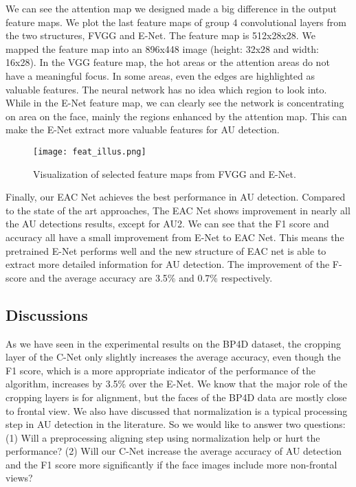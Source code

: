 \documentclass[a4paper, 10pt, conference]{ieeeconf}      %
\begin{document}
We can see the attention map we designed made a big difference in the output feature maps. We plot the last feature maps of group 4 convolutional layers from the two structures, FVGG and E-Net. The feature map is 512x28x28. We mapped the feature map into an 896x448 image (height: 32x28 and width: 16x28). In the VGG feature map, the hot areas or the attention areas do not have a meaningful focus. In some areas, even the edges are highlighted as valuable features. The neural network has no idea which region to look into. While in the E-Net feature map, we can clearly see the network is concentrating on area on the face, mainly the regions enhanced by the attention map. This can make the E-Net extract more valuable features for AU detection.

 \begin{figure}[thpb]
      \centering
      \texttt{[image: feat\_illus.png]}
      \caption{Visualization of selected feature maps from FVGG and E-Net.}
      \label{fig6}
   \end{figure}
Finally, our EAC Net achieves the best performance in AU detection. Compared to the state of the art approaches, The EAC Net shows improvement in nearly all the AU detections results, except for AU2. We can see that the F1 score and accuracy all have a small improvement from E-Net to EAC Net. This means the pretrained E-Net performs well and the new structure of EAC net is able to extract more detailed information for AU detection. The improvement of the F-score and the average accuracy are 3.5\% and 0.7\% respectively.

\subsection{Discussions}

As we have seen in the experimental results on the BP4D dataset, the cropping layer of the C-Net only slightly increases the average accuracy, even though the F1 score, which is a more appropriate indicator of the performance of the algorithm, increases by 3.5\% over the E-Net. We know that the major role of the cropping layers is for alignment, but the faces of the BP4D data are mostly close to frontal view. We also have discussed that normalization is a typical processing step in AU detection in the literature. So we would like to answer two questions: (1) Will a preprocessing aligning step using normalization help or hurt the performance? (2) Will our C-Net increase the average accuracy of AU detection and the F1 score more significantly if the face images include more non-frontal views?
\end{document}
